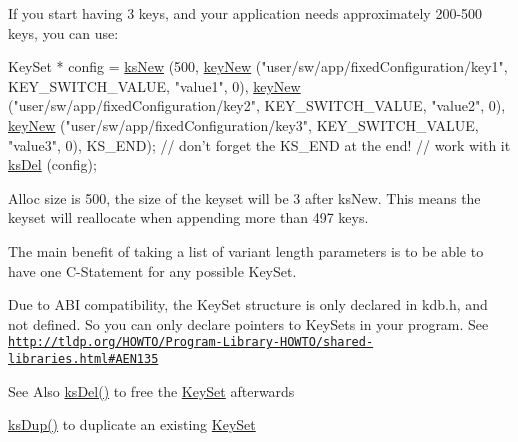 If you start having 3 keys, and your application needs approximately 200-\/500 keys, you can use\-: 
\begin{DoxyCode}
KeySet * config = \hyperlink{group__keyset_ga671e1aaee3ae9dc13b4834a4ddbd2c3c}{ksNew} (500,
        \hyperlink{group__key_gaf6893c038b3ebee90c73a9ea8356bebf}{keyNew} (\textcolor{stringliteral}{"user/sw/app/fixedConfiguration/key1"}, KEY\_SWITCH\_VALUE, \textcolor{stringliteral}{
      "value1"}, 0),
        \hyperlink{group__key_gaf6893c038b3ebee90c73a9ea8356bebf}{keyNew} (\textcolor{stringliteral}{"user/sw/app/fixedConfiguration/key2"}, KEY\_SWITCH\_VALUE, \textcolor{stringliteral}{
      "value2"}, 0),
        \hyperlink{group__key_gaf6893c038b3ebee90c73a9ea8356bebf}{keyNew} (\textcolor{stringliteral}{"user/sw/app/fixedConfiguration/key3"}, KEY\_SWITCH\_VALUE, \textcolor{stringliteral}{
      "value3"}, 0),
        KS\_END); \textcolor{comment}{// don't forget the KS\_END at the end!}
\textcolor{comment}{// work with it}
\hyperlink{group__keyset_ga27e5c16473b02a422238c8d970db7ac8}{ksDel} (config);
\end{DoxyCode}
 Alloc size is 500, the size of the keyset will be 3 after ks\-New. This means the keyset will reallocate when appending more than 497 keys.

The main benefit of taking a list of variant length parameters is to be able to have one C-\/\-Statement for any possible Key\-Set.

Due to A\-B\-I compatibility, the {\ttfamily Key\-Set} structure is only declared in kdb.\-h, and not defined. So you can only declare {\ttfamily pointers} to {\ttfamily Key\-Sets} in your program. See \href{http://tldp.org/HOWTO/Program-Library-HOWTO/shared-libraries.html#AEN135}{\tt http\-://tldp.\-org/\-H\-O\-W\-T\-O/\-Program-\/\-Library-\/\-H\-O\-W\-T\-O/shared-\/libraries.\-html\#\-A\-E\-N135}

\begin{DoxySeeAlso}{See Also}
\hyperlink{group__keyset_ga27e5c16473b02a422238c8d970db7ac8}{ks\-Del()} to free the \hyperlink{group__keyset}{Key\-Set} afterwards 

\hyperlink{group__keyset_gac59e4b328245463f1451f68d5106151c}{ks\-Dup()} to duplicate an existing \hyperlink{group__keyset}{Key\-Set} 
\end{DoxySeeAlso}

